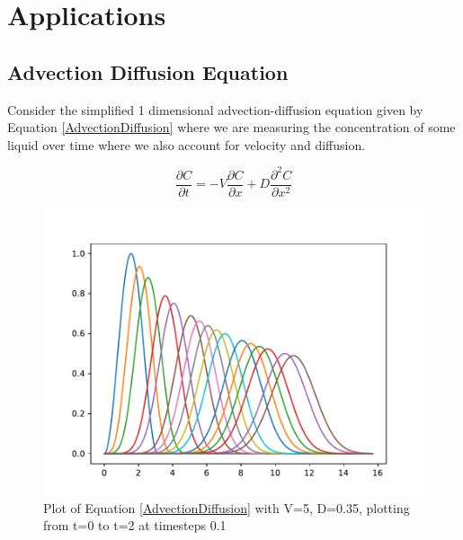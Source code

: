 \documentclass{article}
\begin{document}
\section{Applications}
\subsection{Advection Diffusion Equation}

Consider the simplified 1 dimensional advection-diffusion equation given by Equation \ref{AdvectionDiffusion} where we are measuring the concentration of some liquid over time where we also account for velocity and diffusion.

\begin{equation}
    \label{AdvectionDiffusion}
    \frac{\partial C}{\partial t} = - V\frac{\partial C}{\partial x} + D\frac{\partial^2 C}{\partial x^2}
\end{equation}


\begin{figure}
    \centering
    \includegraphics{Figure_1_ODE.pdf}
    \caption{Plot of Equation \ref{AdvectionDiffusion} with V=5, D=0.35, plotting from t=0 to t=2 at timesteps 0.1}
    \label{fig:ODE}
\end{figure}

\newpage


\end{document}
